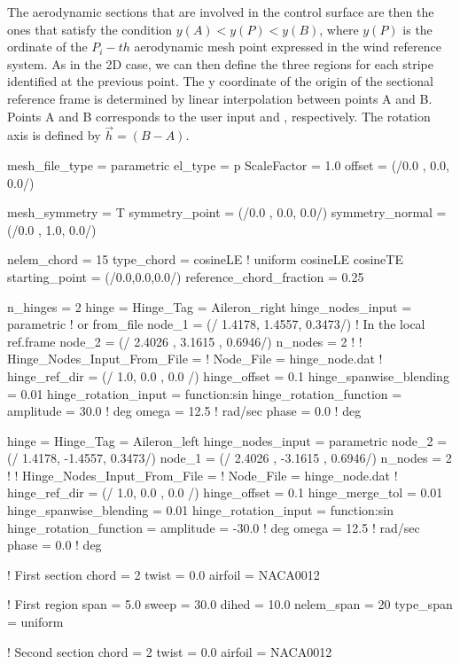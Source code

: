 The aerodynamic sections that are involved in the control surface are then the ones that satisfy the condition $y(A) < y(P) < y(B)$, where $y(P)$ is the ordinate of the $P_i-th$ aerodynamic mesh point expressed in the wind reference system. 
As in the 2D case, we can then define the three regions for each stripe identified at the previous point. The y coordinate of the origin of the sectional reference frame is determined by linear interpolation between points A and B. 
Points A and B corresponds to the user input  and , respectively. The rotation axis is defined by $\Vec{h} = (B - A)$.

\begin{inputfile}[frame=single, caption={Parametric geometry for flapped wing}, label={file:parametric_example_flapped_wing.in}]
mesh_file_type = parametric
el_type = p
ScaleFactor = 1.0
offset = (/0.0 , 0.0,  0.0/)

mesh_symmetry = T
symmetry_point   = (/0.0 , 0.0,  0.0/)
symmetry_normal = (/0.0 , 1.0,  0.0/)

nelem_chord = 15
type_chord = cosineLE   ! uniform  cosineLE  cosineTE
starting_point = (/0.0,0.0,0.0/)
reference_chord_fraction = 0.25

n_hinges = 2
hinge = {
  Hinge_Tag = Aileron_right
  hinge_nodes_input = parametric      ! or from_file
  node_1 = (/ 1.4178, 1.4557, 0.3473/)  ! In the local ref.frame
  node_2 = (/ 2.4026  , 3.1615  , 0.6946/)
  n_nodes = 2
  ! }
  ! Hinge_Nodes_Input_From_File = {
  !   Node_File = hinge_node.dat
  ! }
  hinge_ref_dir = (/ 1.0, 0.0 , 0.0 /)
  hinge_offset  = 0.1
  hinge_spanwise_blending = 0.01
  hinge_rotation_input = function:sin
  hinge_rotation_function = {
    amplitude = 30.0    ! deg
    omega     =  12.5   ! rad/sec
    phase     =  0.0    ! deg
  }

hinge = {
  Hinge_Tag = Aileron_left
  hinge_nodes_input = parametric      
  node_2 = (/ 1.4178, -1.4557, 0.3473/)  
  node_1 = (/ 2.4026  , -3.1615  , 0.6946/)
  n_nodes = 2
  ! }
  ! Hinge_Nodes_Input_From_File = {
  !   Node_File = hinge_node.dat
  ! }
  hinge_ref_dir = (/ 1.0, 0.0 , 0.0 /)
  hinge_offset  = 0.1
  hinge_merge_tol = 0.01
  hinge_spanwise_blending = 0.01
  hinge_rotation_input = function:sin
  hinge_rotation_function = {
    amplitude = -30.0    ! deg
    omega     =  12.5    ! rad/sec
    phase     =  0.0     ! deg
  }


! First section
chord = 2
twist = 0.0
airfoil = NACA0012

! First region
span = 5.0
sweep = 30.0
dihed = 10.0
nelem_span = 20
type_span = uniform

! Second section
chord = 2
twist = 0.0
airfoil = NACA0012
\end{inputfile}

